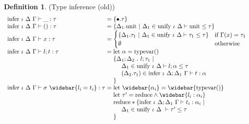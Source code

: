\documentclass[manuscript]{acmart}
\theoremstyle{definition}
\newtheorem{definition}{Definition}[section]
\begin{document}
\begin{definition}(Type inference (old))
\[
  \begin{array}{l @{} l}
    \text{infer } \iota\ \Delta\ \Gamma \vdash 
    \_ : \tau
    &{} =
    \{\bullet.\tau\}
    \\

    \text{infer } \iota\ \Delta\ \Gamma \vdash 
    () : \tau
    &{} =
    \begin{array}[t]{@{} l}
      \{\Delta_1.\text{unit}\ |
      \ \Delta_1 \in \text{unify } \iota\ \Delta \vdash \text{unit} \leq \tau
      \}
    \end{array}
    \\

    \text{infer } \iota\ \Delta\ \Gamma \vdash 
    x : \tau
    &{} =
    \begin{cases}  
      \{\Delta_1.\tau_1\ |
      \ \Delta_1 \in \text{unify } \iota\ \Delta \vdash \tau_1 \leq \tau
      \}
      &\text{if } \Gamma(x) = \tau_1
      \\
      \emptyset
      &\text{otherwise}
    \end{cases}
    \\

    \text{infer } \iota\ \Delta\ \Gamma \vdash 
    l ; t : \tau
    &{} =
    \begin{array}[t]{@{} l}
      \text{let } \alpha = \text{typevar}() 
      \\
      \{\Delta_1;\Delta_2\ .\ l ; \tau_1 \ |
      \\
      \ \ \ \ \Delta_1 \in \text{unify } \iota\ \Delta \vdash l ; \alpha \leq \tau
      \\
      \ \ \ \ (\Delta_2.\tau_1) \in \text{infer } \iota\ \Delta;\Delta_1\ \Gamma \vdash t : \alpha
      \\
      \}
    \end{array}
    \\

    \text{infer } \iota\ \Delta\ \Gamma \vdash 
    \sigma\ \widebar{l_i = t_i} : \tau
    &{} =
    \begin{array}[t]{@{} l}
      \text{let } \widebar{\alpha_i} = \widebar{\text{typevar}()}
      \\
      \text{let } \tau' = \text{reduce} \wedge \widebar{l_i : \alpha_i}
      \\
      \text{reduce} * \{
      \text{infer } \iota\ \Delta;\Delta_1\ \Gamma \vdash t_i : \alpha_i\ |\ 
      \\
      \ \ \ \ \Delta_1 \in \text{unify } \iota\ \Delta\ \vdash \tau' \leq \tau
      \\
      \}
      \\
    \end{array}
    \\


\end{array}\]
\end{definition}
\end{document}
